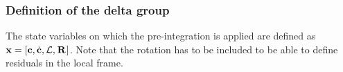 \subsubsection{Definition of the delta group}

The state variables on which the pre-integration is applied are defined as ${\bf x}=[{\bf c}, \dot{{\bf c}}, \mathcal{L}, \prescript{}{}{{\bf R}}_{}]$.
Note that the rotation has to be included to be able to define residuals in the local frame.

